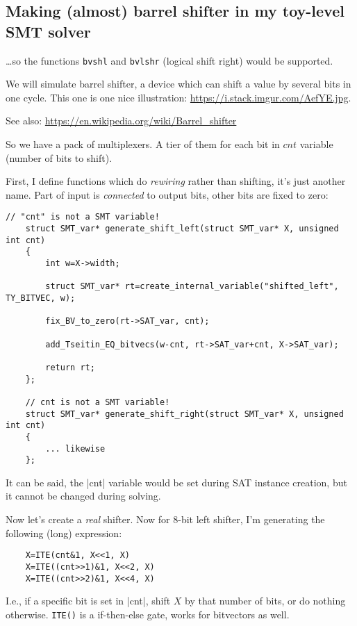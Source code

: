\subsection{Making (almost) barrel shifter in my toy-level SMT solver}

\dots so the functions \verb|bvshl| and \verb|bvlshr| (logical shift right) would be supported.

We will simulate barrel shifter, a device which can shift a value by several bits in one cycle.
This one is one nice illustration:
\url{https://i.stack.imgur.com/AefYE.jpg}.


See also: \url{https://en.wikipedia.org/wiki/Barrel_shifter}

So we have a pack of multiplexers. A tier of them for each bit in $cnt$ variable (number of bits to shift).

First, I define functions which do \textit{rewiring} rather than shifting, it's just another name.
Part of input is \textit{connected} to output bits, other bits are fixed to zero:

\begin{lstlisting}[style=customc]
	// "cnt" is not a SMT variable!
	struct SMT_var* generate_shift_left(struct SMT_var* X, unsigned int cnt)
	{
		int w=X->width;

		struct SMT_var* rt=create_internal_variable("shifted_left", TY_BITVEC, w);

		fix_BV_to_zero(rt->SAT_var, cnt);

		add_Tseitin_EQ_bitvecs(w-cnt, rt->SAT_var+cnt, X->SAT_var);

		return rt;
	};

	// cnt is not a SMT variable!
	struct SMT_var* generate_shift_right(struct SMT_var* X, unsigned int cnt)
	{
		... likewise
	};
\end{lstlisting}

It can be said, the |cnt| variable would be set during SAT instance creation, but it cannot be changed during solving.

Now let's create a \textit{real} shifter.
Now for 8-bit left shifter, I'm generating the following (long) expression:

\begin{lstlisting}
	X=ITE(cnt&1, X<<1, X)
	X=ITE((cnt>>1)&1, X<<2, X)
	X=ITE((cnt>>2)&1, X<<4, X)
\end{lstlisting}

I.e., if a specific bit is set in |cnt|, shift $X$ by that number of bits, or do nothing otherwise.
\verb|ITE()| is a if-then-else gate, works for bitvectors as well.

